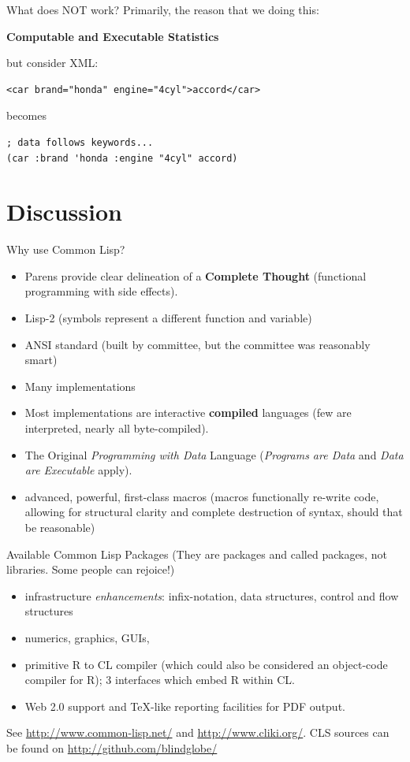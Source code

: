 \documentclass{beamer}
\begin{document}
\begin{frame}[fragile]{What does NOT work?}
  Primarily, the reason that we doing this:
  
  \textbf{Computable and Executable Statistics}

  but consider XML:
\begin{verbatim}
<car brand="honda" engine="4cyl">accord</car>
\end{verbatim}
becomes
\begin{verbatim}
; data follows keywords...
(car :brand 'honda :engine "4cyl" accord)
\end{verbatim}
\end{frame}

\section{Discussion}

\begin{frame}{Why use Common Lisp?}
  \begin{itemize}
  \item Parens provide clear delineation of a \textbf{Complete
      Thought} (functional programming with side effects).
  \item Lisp-2 (symbols represent a different function and variable)
  \item ANSI standard (built by committee, but the committee was
    reasonably smart)
  \item Many implementations
  \item Most implementations are interactive \textbf{compiled}
    languages (few are interpreted, nearly all  byte-compiled).
  \item The Original \emph{Programming with Data} Language
    (\emph{Programs are Data} and \emph{Data are Executable} apply).
  \item advanced, powerful, first-class macros (macros functionally
    re-write code, allowing for structural clarity and complete
    destruction of syntax, should that be reasonable)
  \end{itemize}
\end{frame}

\begin{frame}{Available Common Lisp Packages}
  (They are packages and called packages, not libraries.  Some people
  can rejoice!)
  \begin{itemize}
  \item infrastructure \emph{enhancements}: infix-notation, data
    structures, control and flow structures
  \item numerics, graphics, GUIs, 
  \item primitive R to CL compiler (which could also be considered an
    object-code compiler for R); 3 interfaces which embed R within CL.
  \item Web 2.0 support and TeX-like reporting facilities for PDF
    output.
  \end{itemize}
  See \url{http://www.common-lisp.net/} and
  \url{http://www.cliki.org/}.  CLS sources can be found on
  \url{http://github.com/blindglobe/}
\end{frame}
\end{document}
